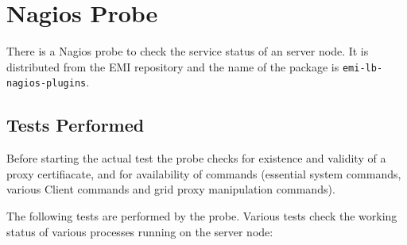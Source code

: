 %
%

\section{Nagios Probe}
\label{s:nagios}

There is a Nagios probe to check the service status of an \LB server node. It is distributed from the EMI repository and the name of the package is \texttt{emi-lb-nagios-plugins}. 

\subsection{Tests Performed}
Before starting the actual test the probe checks for existence and validity of a proxy certifiacate, and for availability of commands (essential system commands, various \LB Client commands and grid proxy manipulation commands).

The following tests are performed by the probe. Various tests check the working status of various processes running on the \LB server node:

